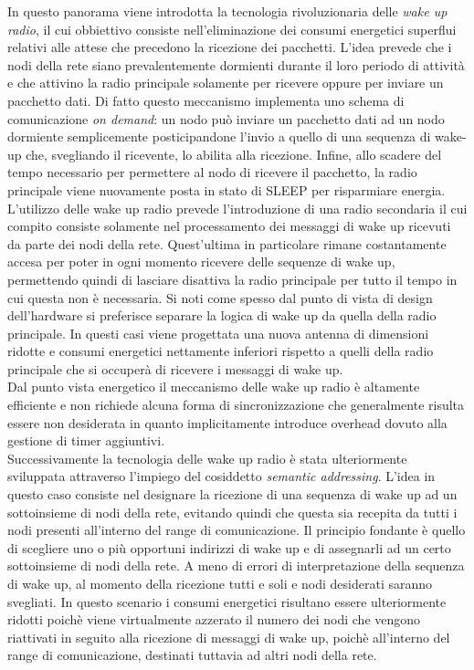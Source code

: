 \documentclass[binding=0.6cm,TFA]{sapthesis}
\begin{document}
In questo panorama viene introdotta la tecnologia rivoluzionaria delle \emph{wake up radio}, il cui obbiettivo consiste nell'eliminazione dei consumi energetici
superflui relativi alle attese che precedono la ricezione dei pacchetti. L'idea prevede che i nodi della rete siano prevalentemente dormienti durante il loro
periodo di attività e che attivino la radio principale solamente per ricevere oppure per inviare un pacchetto dati. Di fatto questo meccanismo implementa uno
schema di comunicazione \emph{on demand}: un nodo può inviare un pacchetto dati ad un nodo dormiente semplicemente posticipandone l'invio a quello di una
sequenza di wake-up che, svegliando il ricevente, lo abilita alla ricezione. Infine, allo scadere del tempo necessario per permettere al nodo di ricevere il
pacchetto, la radio principale viene nuovamente posta in stato di SLEEP per risparmiare energia.\\

L'utilizzo delle wake up radio prevede l'introduzione di una radio secondaria il cui compito consiste solamente nel processamento dei messaggi di wake up ricevuti
da parte dei nodi della rete. Quest'ultima in particolare rimane costantamente accesa per poter in ogni momento ricevere delle sequenze di wake up, permettendo
quindi di lasciare disattiva la radio principale per tutto il tempo in cui questa non è necessaria. Si noti come spesso dal punto di vista di design
dell'hardware si preferisce separare la logica di wake up da quella della radio principale. In questi casi viene progettata una nuova antenna di dimensioni
ridotte e consumi energetici nettamente inferiori rispetto a quelli della radio principale che si occuperà di ricevere i messaggi di wake up.\\

Dal punto vista energetico il meccanismo delle wake up radio è altamente efficiente e non richiede alcuna forma di sincronizzazione che generalmente
risulta essere  non desiderata in quanto implicitamente introduce overhead dovuto alla gestione di timer aggiuntivi.\\

Successivamente la tecnologia delle wake up radio è stata ulteriormente sviluppata attraverso l'impiego del cosiddetto \emph{semantic addressing}.
L'idea in questo caso consiste nel designare la ricezione di una sequenza di wake up ad un sottoinsieme di nodi della rete, evitando quindi che questa sia
recepita da tutti i nodi presenti all'interno del range di comunicazione. Il principio fondante è quello di scegliere uno o più opportuni indirizzi di
wake up e di assegnarli ad un certo sottoinsieme di nodi della rete. A meno di errori di interpretazione della sequenza di wake up, al momento della
ricezione tutti e soli e nodi desiderati saranno svegliati. In questo scenario i consumi energetici risultano essere ulteriormente ridotti poichè viene
virtualmente azzerato il numero dei nodi che vengono riattivati in seguito alla ricezione di messaggi di wake up, poichè all'interno del range di
comunicazione, destinati tuttavia ad altri nodi della rete.\\
\end{document}
